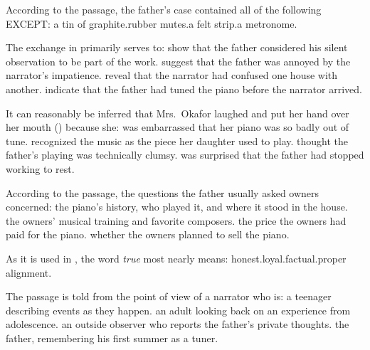 \documentclass[11pt]{article}
\begin{document}
{According to the passage, the father's case contained all of the following EXCEPT:}
{a tin of graphite.}{rubber mutes.}{a felt strip.}{a metronome.}

{The exchange in  primarily serves to:}
{show that the father considered his silent observation to be part of the work.}
{suggest that the father was annoyed by the narrator's impatience.}
{reveal that the narrator had confused one house with another.}
{indicate that the father had tuned the piano before the narrator arrived.}

{It can reasonably be inferred that Mrs.~Okafor laughed and put her hand over her mouth () because she:}
{was embarrassed that her piano was so badly out of tune.}
{recognized the music as the piece her daughter used to play.}
{thought the father's playing was technically clumsy.}
{was surprised that the father had stopped working to rest.}

{According to the passage, the questions the father usually asked owners concerned:}
{the piano's history, who played it, and where it stood in the house.}
{the owners' musical training and favorite composers.}
{the price the owners had paid for the piano.}
{whether the owners planned to sell the piano.}

{As it is used in , the word \emph{true} most nearly means:}
{honest.}{loyal.}{factual.}{proper alignment.}

{The passage is told from the point of view of a narrator who is:}
{a teenager describing events as they happen.}
{an adult looking back on an experience from adolescence.}
{an outside observer who reports the father's private thoughts.}
{the father, remembering his first summer as a tuner.}
\end{document}
